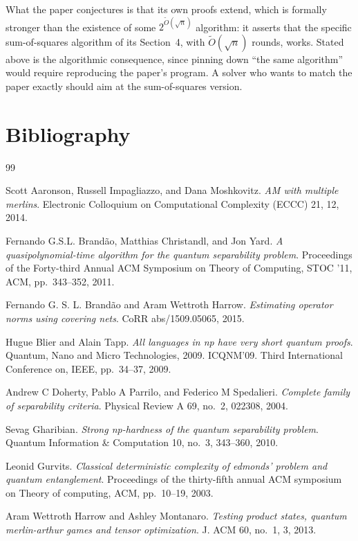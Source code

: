 \documentclass{conjura-conjecture}
\newcommand{\tO}{\tilde{O}}
\begin{document}
\begin{remark}\label{rem:sosform}
What the paper conjectures is that its own proofs extend, which is
formally stronger than the existence of some $2^{\tO(\sqrt{n})}$
algorithm: it asserts that the specific sum-of-squares algorithm of its
Section~4, with $\tO(\sqrt{n})$ rounds, works. Stated above is the
algorithmic consequence, since pinning down ``the same algorithm''
would require reproducing the paper's program. A solver who wants to
match the paper exactly should aim at the sum-of-squares version.
\end{remark}

\section{Bibliography}

\begin{conjurabibliography}{99}

Scott Aaronson, Russell Impagliazzo, and Dana Moshkovitz.
\emph{AM with multiple merlins}.
Electronic Colloquium on Computational Complexity (ECCC) 21, 12, 2014.

Fernando G.S.L. Brand\~{a}o, Matthias Christandl, and Jon Yard.
\emph{A quasipolynomial-time algorithm for the quantum separability
problem}.
Proceedings of the Forty-third Annual ACM Symposium on Theory of
Computing, STOC '11, ACM, pp.\ 343--352, 2011.

Fernando G. S. L. Brand\~{a}o and Aram Wettroth Harrow.
\emph{Estimating operator norms using covering nets}.
CoRR abs/1509.05065, 2015.

Hugue Blier and Alain Tapp.
\emph{All languages in np have very short quantum proofs}.
Quantum, Nano and Micro Technologies, 2009. ICQNM'09. Third
International Conference on, IEEE, pp.\ 34--37, 2009.

Andrew C Doherty, Pablo A Parrilo, and Federico M Spedalieri.
\emph{Complete family of separability criteria}.
Physical Review A 69, no.\ 2, 022308, 2004.

Sevag Gharibian.
\emph{Strong np-hardness of the quantum separability problem}.
Quantum Information \& Computation 10, no.\ 3, 343--360, 2010.

Leonid Gurvits.
\emph{Classical deterministic complexity of edmonds' problem and quantum
entanglement}.
Proceedings of the thirty-fifth annual ACM symposium on Theory of
computing, ACM, pp.\ 10--19, 2003.

Aram Wettroth Harrow and Ashley Montanaro.
\emph{Testing product states, quantum merlin-arthur games and tensor
optimization}.
J. ACM 60, no.\ 1, 3, 2013.

\end{conjurabibliography}
\end{document}
